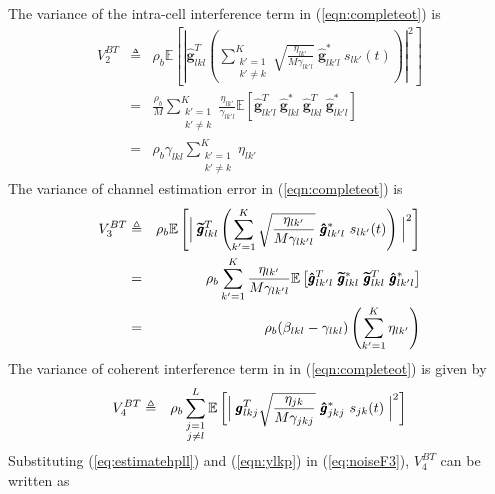 \documentclass[10pt, a4paper, twoside,fleqn]{article}
\begin{document}
The variance of the intra-cell interference term in (\ref{eqn:completeot})  is
\begin{eqnarray}\label{eq:noiseF2}
	V_2^{BT} &\triangleq& \rho_b \mathbb{E}\left[\left\vert \pmb{\hat g}^T_{lkl}  \left(\sum_{\substack{k'=1 \\ k' \neq k}}^{K} \sqrt{\frac{\eta_{lk'}}{M\gamma_{lk'l}}} \ \pmb{\hat g}^*_{lk'l} \ s_{lk'} (t)\right)\right\vert^2\right] \nonumber \\
        &=& \frac{\rho_b}{M} \sum_{\substack{k'=1 \\ k' \neq k}}^{K}\frac{\eta_{lk'}}{\gamma_{lk'l}}\mathbb{E}\left[ \pmb{\hat g}^T_{lk'l} \ \pmb{\hat g}^*_{lkl} \ \pmb{\hat g}^T_{lkl} \ \pmb{\hat g}^*_{lk'l} \right] \nonumber \\
	    &=&  \rho_b\gamma_{lkl}\sum\limits_{\substack{k'=1\\ k'\neq k}}^{K}\eta_{lk'}
\end{eqnarray}
The variance of channel estimation error in (\ref{eqn:completeot}) is
\begin{eqnarray}\label{eqn:noiseF4}
	V_3^{BT} &\triangleq& \rho_b \mathbb{E} \left[ \Bigm | \pmb{\widetilde{g}}_{lkl}^T \left(\sum_{k'=1}^{K} \sqrt{\frac{\eta_{lk'}}{M\gamma_{lk'l}}} \ \pmb{\hat g}^*_{lk'l} \ s_{lk'} (t)\right)\Bigm|^2 \right] \nonumber \\
     &=& \rho_b\sum_{k'=1}^{K} \frac{\eta_{lk'}}{M\gamma_{lk'l}} \mathbb{E}\left[\pmb{\hat g}_{lk'l}^T \ \pmb{\widetilde{g}}^*_{lkl} \ \pmb{\widetilde{g}}_{lkl}^T \ \pmb{\hat g}_{lk'l}^{*} \right] \nonumber \\
        &=& \rho_b(\beta_{lkl}-\gamma_{lkl})\left(\sum\limits_{k'=1}^{K}\eta_{lk'}\right)
\end{eqnarray}
The variance of coherent interference term in  in (\ref{eqn:completeot}) is given by
\begin{eqnarray}\label{eq:noiseF3}
	V_4^{BT} &\triangleq& \rho_b \sum_{\substack{j=1 \\ j \neq l}}^{L}\mathbb{E}\left[\Bigm| \pmb{g}_{lkj}^T \sqrt{\frac{\eta_{jk}}{M\gamma_{jkj}}} \ \pmb{\hat g}^*_{jkj} \ s_{jk} (t)\Bigm|^2\right] 
\end{eqnarray}
Substituting (\ref{eq:estimatehpll}) and (\ref{eqn:ylkp}) in (\ref{eq:noiseF3}), $V_4^{BT}$ can be written as
\end{document}
